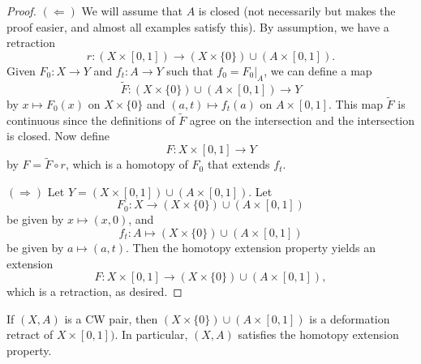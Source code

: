 \begin{proof}
  $(\Leftarrow)$ We will assume that $A$ is closed
  (not necessarily but makes the proof easier, and almost
  all examples satisfy this). By assumption, we
  have a retraction
  \[
    r : (X \times [0, 1]) \to (X \times \{0\}) \cup (A \times [0, 1]).
  \]
  Given $F_0 : X \to Y$ and $f_t : A \to Y$
  such that $f_0 = F_0|_A$, we can define a map
  \[
    \widetilde{F} : (X \times \{0\}) \cup (A \times [0, 1]) \to Y
  \]
  by $x \mapsto F_0(x)$ on $X \times \{0\}$ and
  $(a, t) \mapsto f_t(a)$ on $A \times [0, 1]$.
  This map $\widetilde{F}$ is continuous since the definitions of
  $\widetilde{F}$ agree on the intersection and the
  intersection is closed. Now define
  \[F : X \times [0, 1] \to Y\]
  by $F = \widetilde{F} \circ r$,
  which is a homotopy of $F_0$ that extends $f_t$.

  $(\Rightarrow)$ Let $Y = (X \times [0, 1]) \cup (A \times [0, 1])$. Let
  \[F_0 : X \to (X \times \{0\}) \cup (A \times [0, 1])\]
  be given by $x \mapsto (x, 0)$, and
  \[
    f_t : A \mapsto (X \times \{0\}) \cup (A \times [0, 1])
  \]
  be given by $a \mapsto (a, t)$. Then the homotopy
  extension property yields an extension
  \[F : X \times [0, 1] \to (X \times \{0\}) \cup (A \times [0, 1]),\]
  which is a retraction, as desired.
\end{proof}

\begin{lemma}\label{lem:lemma-5}
  If $(X, A)$ is a CW pair, then
  $(X \times \{0\}) \cup (A \times [0, 1])$ is a
  deformation retract of $X \times [0, 1])$.
  In particular, $(X, A)$ satisfies the homotopy
  extension property.
\end{lemma}

